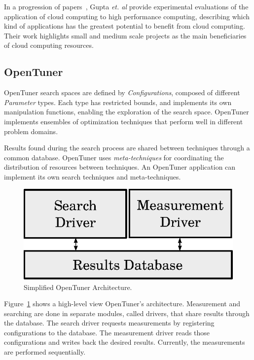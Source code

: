 \documentclass[a4paper, 12pt]{article}
\begin{document}
In a progression of papers~\cite{gupta2012exploring,gupta2014evaluating,gupta2013hpccloud},
Gupta \emph{et. al} provide experimental evaluations of the application of
cloud computing to high performance computing, describing which kind of
applications has the greatest potential to benefit from cloud computing.
Their work highlights small and medium scale projects as the main beneficiaries
of cloud computing resources.

\subsection{OpenTuner} \label{sec:opt}

OpenTuner search spaces are defined by \emph{Configurations}, composed of
different \emph{Parameter} types. Each type has restricted bounds, and
implements its own manipulation functions, enabling the exploration of the
search space.  OpenTuner implements ensembles of optimization
techniques that perform well in different problem domains.

Results found during the search process are shared between techniques through a
common database. OpenTuner uses \emph{meta-techniques} for coordinating
the distribution of resources between techniques. An OpenTuner
application can implement its own search techniques and meta-techniques.

\begin{figure}[htpb]
    \centering
    \includegraphics[scale=.62]{opentuner-implementation}
    \caption{Simplified OpenTuner Architecture.}
    \label{fig:ot-imp}
\end{figure}

Figure~\ref{fig:ot-imp} shows a high-level view OpenTuner's architecture.
Measurement and searching are done in separate modules, called drivers,
that share results through the database. The search driver requests
measurements by registering configurations to the database. The measurement
driver reads those configurations and writes back the desired results.
Currently, the measurements are performed sequentially.
\end{document}
